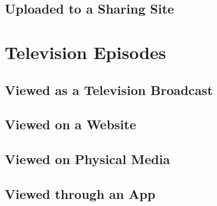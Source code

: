\documentclass{article}
\begin{document}
\subsection{Uploaded to a Sharing Site} %
\label{sub:uploaded_to_a_sharing_site}
\begin{refsection}
	\printbibliography[heading=none]
\end{refsection}
\section{Television Episodes} %
\label{sec:television_episodes}
\subsection{Viewed as a Television Broadcast} %
\label{sub:viewed_as_a_television_broadcast}
\begin{refsection}
	\printbibliography[heading=none]
\end{refsection}
\subsection{Viewed on a Website} %
\label{sub:tv_viewed_on_a_website}
\begin{refsection}
	\printbibliography[heading=none]
\end{refsection}
\subsection{Viewed on Physical Media} %
\label{sub:tv_viewed_on_physical_media}
\begin{refsection}
	\printbibliography[heading=none]
\end{refsection}
\subsection{Viewed through an App} %
\label{sub:tv_viewed_through_an_app}
\begin{refsection}
	\printbibliography[heading=none]
\end{refsection}
\end{document}
